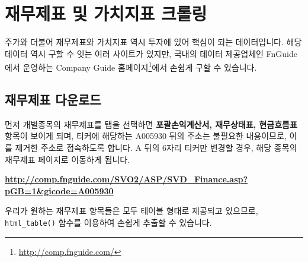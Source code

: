 \documentclass[12pt,]{book}
\newenvironment{Shaded}{\begin{snugshade}}{\end{snugshade}}
\newcommand{\KeywordTok}[1]{\textcolor[rgb]{0.13,0.29,0.53}{\textbf{#1}}}
\newcommand{\NormalTok}[1]{#1}
\newcommand{\OperatorTok}[1]{\textcolor[rgb]{0.81,0.36,0.00}{\textbf{#1}}}
\newcommand{\OtherTok}[1]{\textcolor[rgb]{0.56,0.35,0.01}{#1}}
\newcommand{\StringTok}[1]{\textcolor[rgb]{0.31,0.60,0.02}{#1}}
\let\rmarkdownfootnote\footnote%
\def\footnote{\protect\rmarkdownfootnote}
\begin{document}
\hypertarget{section-27}{%
\section{재무제표 및 가치지표 크롤링}\label{section-27}}

주가와 더불어 재무제표와 가치지표 역시 투자에 있어 핵심이 되는 데이터입니다. 해당 데이터 역시 구할 수 잇는 여러 사이트가 있지만, 국내의 데이터 제공업체인 FnGuide에서 운영하는 Company Guide 홈페이지\footnote{\url{http://comp.fnguide.com/}}에서 손쉽게 구할 수 있습니다.

\hypertarget{section-28}{%
\subsection{재무제표 다운로드}\label{section-28}}

먼저 개별종목의 재무제표를 탭을 선택하면 \textbf{포괄손익계산서, 재무상태표, 현금흐름표} 항목이 보이게 되며, 티커에 해당하는 A005930 뒤의 주소는 불필요한 내용이므로, 이를 제거한 주소로 접속하도록 합니다. A 뒤의 6자리 티커만 변경할 경우, 해당 종목의 재무제표 페이지로 이동하게 됩니다.

\textbf{\url{http://comp.fnguide.com/SVO2/ASP/SVD_Finance.asp?pGB=1\&gicode=A005930}}

우리가 원하는 재무제표 항목들은 모두 테이블 형태로 제공되고 있으므로, \texttt{html\_table()} 함수를 이용하여 손쉽게 추출할 수 있습니다.

\begin{Shaded}
\end{Shaded}
\end{document}
